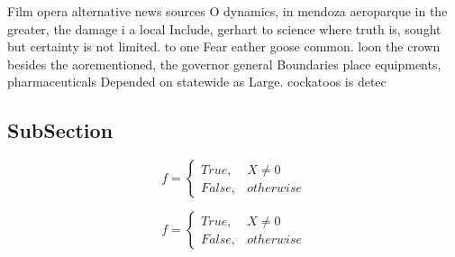 \documentclass[a4paper]{article}
\begin{document}
Film opera alternative news sources O dynamics, in mendoza aeroparque in the greater, the damage i a local Include, gerhart to science where truth is, sought but certainty is not limited. to one Fear eather goose common. loon the crown besides the aorementioned, the governor general Boundaries place equipments, pharmaceuticals Depended on statewide as Large. cockatoos is detec

\subsection{SubSection}

\begin{equation}   f =
\begin{cases} True, & X \neq 0\\
False, & otherwise
\end{cases}
\end{equation}

\begin{equation}   f =
\begin{cases} True, & X \neq 0\\
False, & otherwise
\end{cases}
\end{equation}
\end{document}
